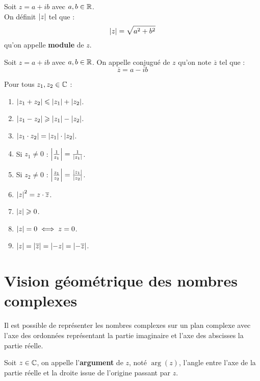\begin{definition}
    Soit $z = a + ib$ avec $a, b \in \mathbb{R}$. 
    \\
    On définit $\abs{z}$ tel que :
    \[ \abs{z} = \sqrt{a^2 + b^2} \]
    qu'on appelle \textbf{module} de $z$.
\end{definition}

\begin{definition}
    Soit $z = a + ib$ avec $a, b \in \mathbb{R}$. On appelle conjugué de $z$ qu'on note $\overline{z}$ tel que :
    \[ \overline{z} = a - ib \]
\end{definition}

\begin{proposition}
    Pour tous $z_1, z_2 \in \mathbb{C}$ :
    \begin{enumerate}
            \item $\abs{z_1 + z_2} \leqslant \abs{z_1} + \abs{z_2}$.
            \item $\abs{z_1 - z_2} \geqslant \abs{z_1} - \abs{z_2}$.
            \item $\abs{z_1 \cdot z_2} = \abs{z_1} \cdot \abs{z_2}$.
            \item Si $z_1 \neq 0$ : $\abs{\frac{1}{z_1}} = \frac{1}{\abs{z_1}}$.
            \item Si $z_2 \neq 0$ : $\abs{\frac{z_1}{z_2}} = \frac{\abs{z_1}}{\abs{z_2}}$.
            \item $\abs{z}^2 = z \cdot \overline{z}$.
            \item $\abs{z} \geqslant 0$.
            \item $\abs{z} = 0 \iff z = 0$.
            \item $\abs{z} = \abs{\overline{z}} = \abs{-z} = \abs{-\overline{z}}$.
        \end{enumerate}
\end{proposition}

\section{Vision géométrique des nombres complexes}
Il est possible de représenter les nombres complexes sur un plan complexe avec l'axe des ordonnées représentant la partie imaginaire et l'axe des abscisses la partie réelle.

\begin{definition}
	Soit $z \in \mathbb{C}$, on appelle l'\textbf{argument} de $z$, noté $\arg(z)$, l'angle entre l'axe de la partie réelle et la droite issue de l'origine passant par $z$. 
\end{definition}

